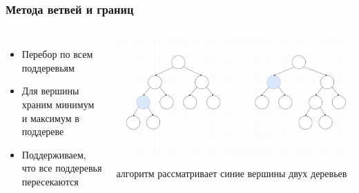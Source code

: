 \documentclass{beamer}
\begin{document}
\begin{frame} \frametitle{Метода ветвей и границ}
    \begin{columns}
            \begin{itemize}
                \item Перебор по всем поддеревьям
                \item Для вершины храним минимум и максимум в поддереве
                \item Поддерживаем, что все поддеревья пересекаются
            \end{itemize}
            \begin{center}
            \includegraphics[height=0.8\textheight]{tree.png}

            алгоритм рассматривает синие вершины двух деревьев
            \end{center}
    \end{columns}
\end{frame}
\end{document}
